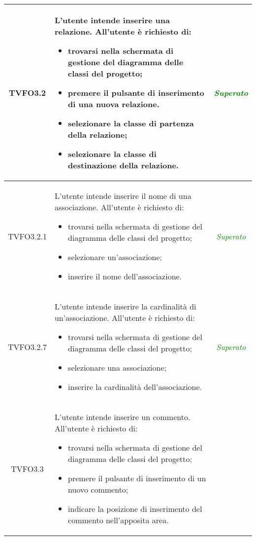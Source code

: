 \begin{longtable}{|c|>{}m{8cm}|c|}
\hypertarget{TVFO3.2}{TVFO3.2} & L'utente intende inserire una relazione.
All'utente è richiesto di:
\begin{itemize}
	\item trovarsi nella schermata di gestione del diagramma delle classi del progetto;
	\item premere il pulsante di inserimento di una nuova relazione.
	\item selezionare la classe di partenza della relazione;
	\item selezionare la classe di destinazione della relazione.
\end{itemize} & \textcolor{Green}{\textit{Superato}}\\ \hline

\hypertarget{TVFO3.2.1}{TVFO3.2.1} & L'utente intende inserire il nome di una associazione.
All'utente è richiesto di:
\begin{itemize}
	\item trovarsi nella schermata di gestione del diagramma delle classi del progetto;
	\item selezionare un'associazione;
	\item inserire il nome dell'associazione.
\end{itemize} & \textcolor{Green}{\textit{Superato}}\\ \hline

\hypertarget{TVFO3.2.7}{TVFO3.2.7} & L'utente intende inserire la cardinalità di un'associazione.
All'utente è richiesto di:
\begin{itemize}
	\item trovarsi nella schermata di gestione del diagramma delle classi del progetto;
	\item selezionare una associazione;
	\item inserire la cardinalità dell'associazione.
\end{itemize} & \textcolor{Green}{\textit{Superato}}\\ \hline

\hypertarget{TVFO3.3}{TVFO3.3} & L'utente intende inserire un commento. 
All'utente è richiesto di: 
\begin{itemize} 
	\item trovarsi nella schermata di gestione del diagramma delle classi del progetto;
	\item premere il pulsante di inserimento di un nuovo commento;
	\item indicare la posizione di inserimento del commento nell'apposita area.
	

\end{itemize}
\end{longtable}

